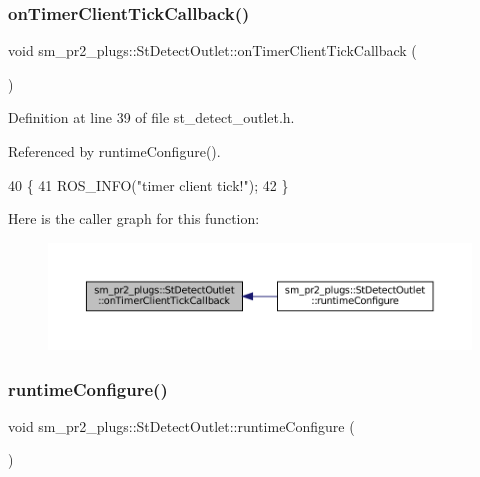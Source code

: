 \subsubsection{\texorpdfstring{on\+Timer\+Client\+Tick\+Callback()}{onTimerClientTickCallback()}}
{\footnotesize\ttfamily void sm\+\_\+pr2\+\_\+plugs\+::\+St\+Detect\+Outlet\+::on\+Timer\+Client\+Tick\+Callback (\begin{DoxyParamCaption}{ }\end{DoxyParamCaption})\hspace{0.3cm}{\ttfamily [inline]}}



Definition at line 39 of file st\+\_\+detect\+\_\+outlet.\+h.



Referenced by runtime\+Configure().


\begin{DoxyCode}
40     \{
41         ROS\_INFO(\textcolor{stringliteral}{"timer client tick!"});
42     \}
\end{DoxyCode}
Here is the caller graph for this function\+:
\nopagebreak
\begin{figure}[H]
\begin{center}
\leavevmode
\includegraphics[width=350pt]{structsm__pr2__plugs_1_1StDetectOutlet_a7d94748f071c0ee4b8055018ec546978_icgraph}
\end{center}
\end{figure}
\mbox{\label{structsm__pr2__plugs_1_1StDetectOutlet_a9fbc44b452367aa843d37316eb6e64bc}} 
\subsubsection{\texorpdfstring{runtime\+Configure()}{runtimeConfigure()}}
{\footnotesize\ttfamily void sm\+\_\+pr2\+\_\+plugs\+::\+St\+Detect\+Outlet\+::runtime\+Configure (\begin{DoxyParamCaption}{ }\end{DoxyParamCaption})\hspace{0.3cm}{\ttfamily [inline]}}



